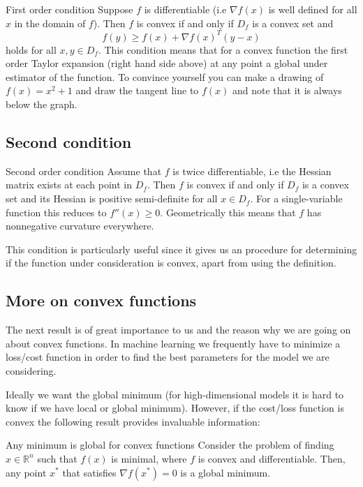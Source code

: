 \documentclass[%
oneside,                 %
final,                   %
10pt]{article}
\begin{document}
\begin{block}{First order condition }
Suppose $f$ is differentiable (i.e $\nabla f(x)$ is well defined for
all $x$ in the domain of $f$). Then $f$ is convex if and only if $D_f$
is a convex set and $$f(y) \geq f(x) + \nabla f(x)^T (y-x) $$ holds
for all $x,y \in D_f$. This condition means that for a convex function
the first order Taylor expansion (right hand side above) at any point
a global under estimator of the function. To convince yourself you can
make a drawing of $f(x) = x^2+1$ and draw the tangent line to $f(x)$ and
note that it is always below the graph.  
\end{block}

\subsection{Second condition}

\begin{block}{Second order condition  }
Assume that $f$ is twice
differentiable, i.e the Hessian matrix exists at each point in
$D_f$. Then $f$ is convex if and only if $D_f$ is a convex set and its
Hessian is positive semi-definite for all $x\in D_f$. For a
single-variable function this reduces to $f''(x) \geq 0$. Geometrically this means that $f$ has nonnegative curvature
everywhere.
\end{block}

This condition is particularly useful since it gives us an procedure for determining if the function under consideration is convex, apart from using the definition.

\subsection{More on convex functions}

The next result is of great importance to us and the reason why we are
going on about convex functions. In machine learning we frequently
have to minimize a loss/cost function in order to find the best
parameters for the model we are considering. 

Ideally we want the
global minimum (for high-dimensional models it is hard to know
if we have local or global minimum). However, if the cost/loss function
is convex the following result provides invaluable information:

\begin{block}{Any minimum is global for convex functions }
Consider the problem of finding $x \in \mathbb{R}^n$ such that $f(x)$
is minimal, where $f$ is convex and differentiable. Then, any point
$x^*$ that satisfies $\nabla f(x^*) = 0$ is a global minimum.
\end{block}
\end{document}

